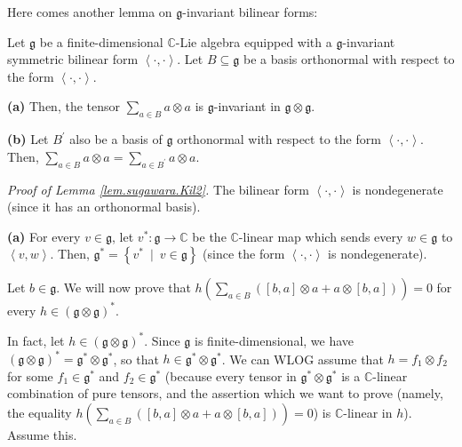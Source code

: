 \documentclass[etingof-lie.tex]{subfiles}
\begin{document}
Here comes another lemma on $\mathfrak{g}$-invariant bilinear forms:

\begin{lemma}
\label{lem.sugawara.Kil2}Let $\mathfrak{g}$ be a finite-dimensional
$\mathbb{C}$-Lie algebra equipped with a $\mathfrak{g}$-invariant symmetric
bilinear form $\left\langle \cdot,\cdot\right\rangle $. Let $B\subseteq
\mathfrak{g}$ be a basis orthonormal with respect to the form $\left\langle
\cdot,\cdot\right\rangle $.

\textbf{(a)} Then, the tensor $\sum\limits_{a\in B}a\otimes a$ is
$\mathfrak{g}$-invariant in $\mathfrak{g}\otimes\mathfrak{g}$.

\textbf{(b)} Let $B^{\prime}$ also be a basis of $\mathfrak{g}$ orthonormal
with respect to the form $\left\langle \cdot,\cdot\right\rangle $. Then,
$\sum\limits_{a\in B}a\otimes a=\sum\limits_{a\in B^{\prime}}a\otimes a$.
\end{lemma}

\textit{Proof of Lemma \ref{lem.sugawara.Kil2}.} The bilinear form
$\left\langle \cdot,\cdot\right\rangle $ is nondegenerate (since it has an
orthonormal basis).

\textbf{(a)} For every $v\in\mathfrak{g}$, let $v^{\ast}:\mathfrak{g}%
\rightarrow\mathbb{C}$ be the $\mathbb{C}$-linear map which sends every
$w\in\mathfrak{g}$ to $\left\langle v,w\right\rangle $. Then, $\mathfrak{g}%
^{\ast}=\left\{  v^{\ast}\ \mid\ v\in\mathfrak{g}\right\}  $ (since the form
$\left\langle \cdot,\cdot\right\rangle $ is nondegenerate).

Let $b\in\mathfrak{g}$. We will now prove that $h\left(  \sum\limits_{a\in
B}\left(  \left[  b,a\right]  \otimes a+a\otimes\left[  b,a\right]  \right)
\right)  =0$ for every $h\in\left(  \mathfrak{g}\otimes\mathfrak{g}\right)
^{\ast}$.

In fact, let $h\in\left(  \mathfrak{g}\otimes\mathfrak{g}\right)  ^{\ast}$.
Since $\mathfrak{g}$ is finite-dimensional, we have $\left(  \mathfrak{g}%
\otimes\mathfrak{g}\right)  ^{\ast}=\mathfrak{g}^{\ast}\otimes\mathfrak{g}%
^{\ast}$, so that $h\in\mathfrak{g}^{\ast}\otimes\mathfrak{g}^{\ast}$. We can
WLOG assume that $h=f_{1}\otimes f_{2}$ for some $f_{1}\in\mathfrak{g}^{\ast}$
and $f_{2}\in\mathfrak{g}^{\ast}$ (because every tensor in $\mathfrak{g}%
^{\ast}\otimes\mathfrak{g}^{\ast}$ is a $\mathbb{C}$-linear combination of
pure tensors, and the assertion which we want to prove (namely, the equality
$h\left(  \sum\limits_{a\in B}\left(  \left[  b,a\right]  \otimes
a+a\otimes\left[  b,a\right]  \right)  \right)  =0$) is $\mathbb{C}$-linear in
$h$). Assume this.
\end{document}

